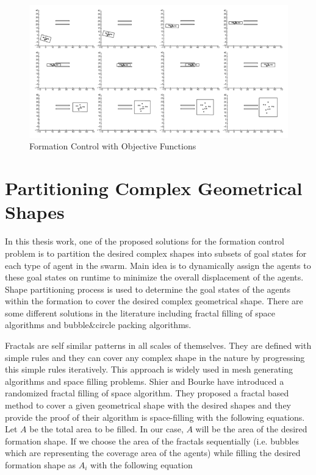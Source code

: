 \begin{figure}[H]
	\caption{Formation Control with Objective Functions \cite{25}} \label{kumar_belta}
	\centering
	\includegraphics[scale = 0.8]{manifold}
\end{figure}



\section{Partitioning Complex Geometrical Shapes}

In this thesis work, one of the proposed solutions for the formation control problem is to partition the desired complex shapes into subsets of goal states for each type of agent in the swarm. Main idea is to dynamically assign the agents to these goal states on runtime to minimize the overall displacement of the agents. Shape partitioning process is used to determine the goal states of the agents within the formation to cover the desired complex geometrical shape. There are some different solutions in the literature including fractal filling of space algorithms and bubble$\&$circle packing algorithms. 

Fractals are self similar  patterns in all scales of themselves. They are defined with simple rules and they can cover any complex shape in the nature by progressing this simple rules iteratively. This approach is widely used in mesh generating algorithms and space filling problems.  Shier and Bourke \cite{26} have introduced a randomized fractal filling of space algorithm. They proposed a fractal based method to cover a given geometrical shape with the desired shapes and they provide the proof of their algorithm is space-filling with the following equations. Let $A$ be the total area to be filled. In our case, $A$ will be the area of the desired formation shape. If we choose the area of the fractals sequentially (i.e. bubbles which are representing the coverage area of the agents)  while filling the desired formation shape as $A_i$ with the following equation

